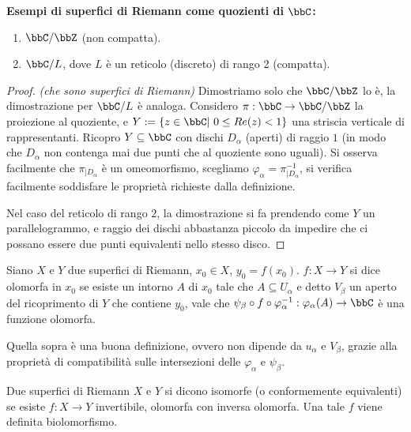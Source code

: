 \textbf{Esempi di superfici di Riemann come quozienti di $\bbC$:}
\begin{enumerate} %
  \item $\bbC/\bbZ$ (non compatta).
  \item $\bbC/L$, dove $L$ è un reticolo (discreto) di rango 2 (compatta).
\end{enumerate}
\begin{proof} \textit{(che sono superfici di Riemann)}
    Dimostriamo solo che $\bbC/\bbZ$ lo è, la dimostrazione per $\bbC/L$ è analoga. Considero $\pi:\bbC\rightarrow\bbC/\bbZ$ la proiezione al quoziente, e $Y:=\{z\in\bbC|\ 0\leq Re(z)<1\}$ una striscia verticale di rappresentanti. Ricopro $Y\subseteq\bbC$ con dischi $D_\alpha$ (aperti) di raggio $1$ (in modo che $D_\alpha$ non contenga mai due punti che al quoziente sono uguali). Si osserva facilmente che $\pi_{|D_\alpha}$ è un omeomorfismo, scegliamo $\varphi_\alpha=\pi_{|D_\alpha}^{-1}$, si verifica facilmente soddisfare le proprietà richieste dalla definizione.

    Nel caso del reticolo di rango $2$, la dimostrazione si fa prendendo come $Y$ un parallelogrammo, e raggio dei dischi abbastanza piccolo da impedire che ci possano essere due punti equivalenti nello stesso disco.
\end{proof}

\begin{definizione}
Siano $X$ e $Y$ due superfici di Riemann, $x_0\in X$, $y_0=f(x_0)$. $f:X\rightarrow Y$ si dice olomorfa in $x_0$ se esiste un intorno $A$ di $x_0$ tale che $A\subseteq U_\alpha$ e detto $V_\beta$ un aperto del ricoprimento di $Y$ che contiene $y_0$, vale che $\psi_\beta \circ f \circ \varphi_\alpha^{-1}: \varphi_\alpha(A)\rightarrow \bbC$ è una funzione olomorfa.
\end{definizione}
\begin{osservazione}
    Quella sopra è una buona definizione, ovvero non dipende da $u_\alpha$ e $V_\beta$, grazie alla proprietà di compatibilità sulle intersezioni delle $\varphi_\alpha$ e $\psi_\beta$.
\end{osservazione}


\begin{definizione}
Due superfici di Riemann $X$ e $Y$ si dicono isomorfe (o conformemente equivalenti) se esiste $f:X\rightarrow Y$ invertibile, olomorfa con inversa olomorfa. Una tale $f$ viene definita biolomorfismo.
\end{definizione}

